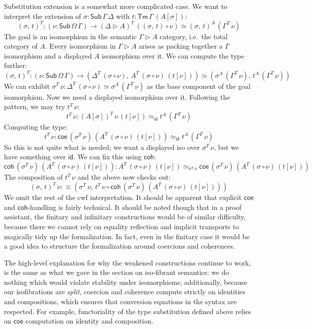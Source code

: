 \documentclass[12pt,a4paper,twoside,openany]{book}
\theoremstyle{remark}
\theoremstyle{definition}
\theoremstyle{theorem}
\newcommand{\id}{\mathsf{id}}
\newcommand{\Sub}{\mathsf{Sub}}
\newcommand{\Tm}{\mathsf{Tm}}
\newcommand{\ext}{\triangleright}
\newcommand{\coe}{\mathsf{coe}}
\newcommand{\coh}{\mathsf{coh}}
\newcommand{\defn}{:\equiv}
\begin{document}
Substitution extension is a somewhat more complicated case. We want to interpret
the extension of $\sigma : \Sub\,\Gamma\,\Delta$ with $t :
\Tm\,\Gamma\,(A[\sigma])$:
\[
      (\sigma,\,t)^T : (\nu : \Sub\,\Omega\,\Gamma)
  \to (\Delta \ext A)^T\,((\sigma,\,t)\circ\nu)\simeq(\sigma,\,t)^A\,(\Gamma^T\,\nu)
\]
The goal is an isomorphism in the semantic $\Gamma \ext A$ category, i.e.\ the
total category of $A$. Every isomorphism in $\Gamma \ext A$ arises as packing
together a $\Gamma$ isomorphism and a displayed $A$ isomorphism over it. We can compute
the type further:
\[
      (\sigma,\,t)^T : (\nu : \Sub\,\Omega\,\Gamma)
  \to (\Delta^T\,(\sigma \circ \nu),\,A^T\,(\sigma\circ\nu)\,(t[\nu])) \simeq (\sigma^A\,(\Gamma^T\,\nu),\,t^A\,(\Gamma^T\,\nu))
\]
We can exhibit $\sigma^T\,\nu : \Delta^T\,(\sigma \circ \nu) \simeq
\sigma^A\,(\Gamma^T\,\nu)$ as the base component of the goal isomorphism. Now we
need a displayed isomorphism over it. Following the pattern, we may try
$t^T\,\nu$:
\[
  t^T\,\nu : (A[\sigma])^T\,\nu\,(t[\nu]) \simeq_{\id} t^A\,(\Gamma^T\,\nu)
\]
Computing the type:
\[
  t^T\,\nu : \coe\,(\sigma^T\,\nu)\,(A^T\,(\sigma\circ\nu)\,(t[\nu])) \simeq_{\id} t^A\,(\Gamma^T\,\nu)
\]
So this is not quite what is needed; we want a displayed iso over $\sigma^T\,\nu$, but we have
something over $\id$. We can fix this using $\coh$:
\[
\coh\,(\sigma^T\,\nu)\,(A^T\,(\sigma\circ\nu)\,(t[\nu])) :
A^T\,(\sigma\circ\nu)\,(t[\nu]) \simeq_{\sigma^T\,\nu} \coe\,(\sigma^T\,\nu)\,(A^T\,(\sigma\circ\nu)\,(t[\nu]))
\]
The composition of $t^T\,\nu$ and the above now checks out:
\[
  (\sigma,\,t)^T\,\nu \defn (\sigma^T\,\nu,\,t^T\,\nu\circ \coh\,(\sigma^T\,\nu)\,(A^T\,(\sigma\circ\nu)\,(t[\nu])))
\]
We omit the rest of the cwf interpretation. It should be apparent that explicit
$\coe$ and $\coh$-handling is fairly technical. It should be noted though that
in a proof assistant, the finitary and infinitary constructions would be of
similar difficulty, because there we cannot rely on equality reflection and
implicit transports to magically tidy up the formalization. In fact, even in the
finitary case it would be a good idea to structure the formalization around coercions
and coherences.

The high-level explanation for why the weakened constructions continue to work,
is the same as what we gave in the section on iso-fibrant semantics: we do
nothing which would violate stability under isomorphisms; additionally, because
our isofibrations are \emph{split}, coercion and coherence compute strictly on
identities and compositions, which ensures that conversion equations in the syntax
are respected. For example, functoriality of the type substitution defined above
relies on $\coe$ computation on identity and composition.
\end{document}
